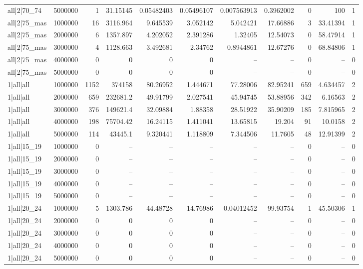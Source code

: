 \begin{tabular}{lrrrrrrrrrr}
all|2|70\_74 & 5000000 & 1 & 31.15145 & 0.05482403 & 0.05496107 & 0.007563913 & 0.3962002 & 0 & 100 & 1 \\
all|2|75\_mas & 1000000 & 16 & 3116.964 & 9.645539 & 3.052142 & 5.042421 & 17.66886 & 3 & 33.41394 & 1 \\
all|2|75\_mas & 2000000 & 6 & 1357.897 & 4.202052 & 2.391286 & 1.32405 & 12.54073 & 0 & 58.47914 & 1 \\
all|2|75\_mas & 3000000 & 4 & 1128.663 & 3.492681 & 2.34762 & 0.8944861 & 12.67276 & 0 & 68.84806 & 1 \\
all|2|75\_mas & 4000000 & 0 & 0 & 0 & 0 & -- & -- & 0 & -- & 0 \\
all|2|75\_mas & 5000000 & 0 & 0 & 0 & 0 & -- & -- & 0 & -- & 0 \\
1|all|all & 1000000 & 1152 & 374158 & 80.26952 & 1.444671 & 77.28006 & 82.95241 & 659 & 4.634457 & 2 \\
1|all|all & 2000000 & 659 & 232681.2 & 49.91799 & 2.027541 & 45.94745 & 53.88956 & 342 & 6.16563 & 2 \\
1|all|all & 3000000 & 376 & 149621.4 & 32.09884 & 1.88358 & 28.51922 & 35.90209 & 185 & 7.815965 & 2 \\
1|all|all & 4000000 & 198 & 75704.42 & 16.24115 & 1.411041 & 13.65815 & 19.204 & 91 & 10.0158 & 2 \\
1|all|all & 5000000 & 114 & 43445.1 & 9.320441 & 1.118809 & 7.344506 & 11.7605 & 48 & 12.91399 & 2 \\
1|all|15\_19 & 1000000 & 0 & -- & -- & -- & -- & -- & 0 & -- & 0 \\
1|all|15\_19 & 2000000 & 0 & -- & -- & -- & -- & -- & 0 & -- & 0 \\
1|all|15\_19 & 3000000 & 0 & -- & -- & -- & -- & -- & 0 & -- & 0 \\
1|all|15\_19 & 4000000 & 0 & -- & -- & -- & -- & -- & 0 & -- & 0 \\
1|all|15\_19 & 5000000 & 0 & -- & -- & -- & -- & -- & 0 & -- & 0 \\
1|all|20\_24 & 1000000 & 5 & 1303.786 & 44.48728 & 14.76986 & 0.04012452 & 99.93754 & 1 & 45.50306 & 1 \\
1|all|20\_24 & 2000000 & 0 & 0 & 0 & 0 & -- & -- & 0 & -- & 0 \\
1|all|20\_24 & 3000000 & 0 & 0 & 0 & 0 & -- & -- & 0 & -- & 0 \\
1|all|20\_24 & 4000000 & 0 & 0 & 0 & 0 & -- & -- & 0 & -- & 0 \\
1|all|20\_24 & 5000000 & 0 & 0 & 0 & 0 & -- & -- & 0 & -- & 0 \\

\end{tabular}
